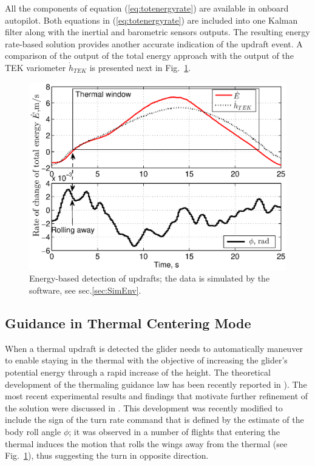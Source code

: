 \documentclass{ifacconf}
\newcommand{\squeezeup}{\vspace{-3.0mm}}
\begin{document}
All the components of equation (\ref{eq:totenergyrate}) are available in
onboard autopilot. Both equations in (\ref{eq:totenergyrate}) are included
into one Kalman filter along with the inertial and barometric sensors
outputs. The resulting energy rate-based solution provides another accurate
indication of the updraft event. A comparison of the output of the total
energy approach with the output of the TEK variometer $\dot{h}_{TEK}$ is
presented next in Fig.~\ref{fig:ThermalDetection}.
\begin{figure}[thpb]
  \centering
  \includegraphics[scale=0.44]{Figures/TEK_Bank_2.eps}
  \caption{Energy-based detection of updrafts; the data is simulated
  by the~\cite{Condor:2013:Online} software, see sec.\ref{sec:SimEnv}.}
  \label{fig:ThermalDetection}
\end{figure}
\squeezeup

\subsection{Guidance in Thermal Centering Mode}
\label{subsec:ThermGuidance}
\squeezeup
When a thermal updraft is detected the glider needs to automatically maneuver
to enable staying in the thermal with the objective of increasing the
glider's potential energy through a rapid increase of the height. The
theoretical development of the thermaling guidance law has been recently
reported in \cite{AKlass_JGCD:2012}). The most recent experimental results
and findings that motivate further refinement of the solution were discussed
in \cite{AKlass_CDC:2012}. This development was recently modified to include
the sign of the turn rate command that is defined by the estimate of the body
roll angle $\phi$; it was observed in a number of flights that entering the
thermal induces the motion that rolls the wings away from the thermal (see
Fig.~\ref{fig:ThermalDetection}), thus suggesting the turn in opposite
direction.
\end{document}
